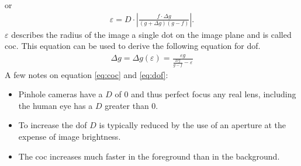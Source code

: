 or
\begin{align}
    \varepsilon = D \cdot | \frac{f \cdot \Delta g}{(g + \Delta g) (g - f)}|.
\end{align}
$\varepsilon$ describes the radius of the image a single dot on the image plane and is called \gls{coc}.
This equation can be used to derive the following equation for \gls{dof}.
\begin{align}
    \Delta g = \Delta g(\varepsilon) = \frac{\varepsilon g}{\frac{D f}{g-f} - \varepsilon}
    \label{eq:dof}
\end{align}
A few notes on equation \ref{eq:coc} and \ref{eq:dof}:
\begin{itemize}
    \item Pinhole cameras have a $D$ of 0 and thus perfect focus any real lens, including the human eye has a $D$ greater than 0.
    \item To increase the \gls{dof} $D$ is typically reduced by the use of an aperture at the expense of image brightness.
    \item The \gls{coc} increases much faster in the foreground than in the background.
\end{itemize}








